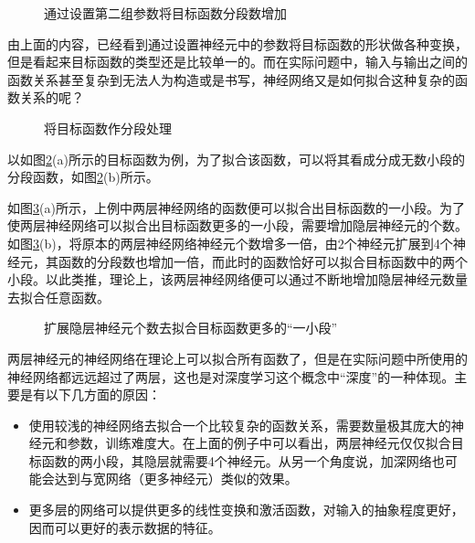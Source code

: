 \begin{figure}[htp]
\centering

\caption{通过设置第二组参数将目标函数分段数增加}
\label{fig:5-22}
\end {figure}

\parinterval 由上面的内容，已经看到通过设置神经元中的参数将目标函数的形状做各种变换，但是看起来目标函数的类型还是比较单一的。而在实际问题中，输入与输出之间的函数关系甚至复杂到无法人为构造或是书写，神经网络又是如何拟合这种复杂的函数关系的呢？

\begin{figure}[htp]
\centering

\caption{将目标函数作分段处理}
\label{fig:5-23}
\end {figure}

\parinterval 以如图\ref{fig:5-23}(a)所示的目标函数为例，为了拟合该函数，可以将其看成分成无数小段的分段函数，如图\ref{fig:5-23}(b)所示。

\parinterval 如图\ref{fig:5-24}(a)所示，上例中两层神经网络的函数便可以拟合出目标函数的一小段。为了使两层神经网络可以拟合出目标函数更多的一小段，需要增加隐层神经元的个数。如图\ref{fig:5-24}(b)，将原本的两层神经网络神经元个数增多一倍，由2个神经元扩展到4个神经元，其函数的分段数也增加一倍，而此时的函数恰好可以拟合目标函数中的两个小段。以此类推，理论上，该两层神经网络便可以通过不断地增加隐层神经元数量去拟合任意函数。

\begin{figure}[htp]
\centering

\caption{扩展隐层神经元个数去拟合目标函数更多的``一小段''}
\label{fig:5-24}
\end {figure}

\parinterval 两层神经元的神经网络在理论上可以拟合所有函数了，但是在实际问题中所使用的神经网络都远远超过了两层，这也是对深度学习这个概念中``深度''的一种体现。主要是有以下几方面的原因：

\begin{itemize}
\vspace{0.5em}
\item 使用较浅的神经网络去拟合一个比较复杂的函数关系，需要数量极其庞大的神经元和参数，训练难度大。在上面的例子中可以看出，两层神经元仅仅拟合目标函数的两小段，其隐层就需要4个神经元。从另一个角度说，加深网络也可能会达到与宽网络（更多神经元）类似的效果。
\vspace{0.5em}
\item 更多层的网络可以提供更多的线性变换和激活函数，对输入的抽象程度更好，因而可以更好的表示数据的特征。
\vspace{0.5em}
\end{itemize}

